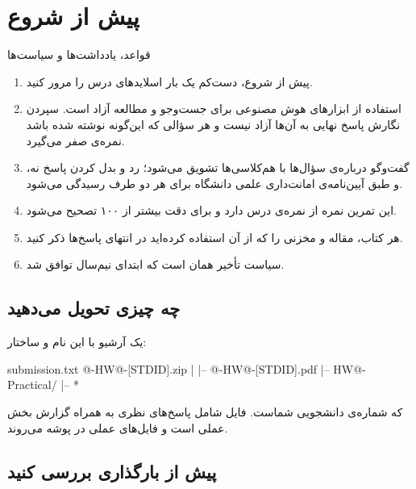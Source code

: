 \section*{پیش از شروع}

\begin{blockbox}{قواعد، یادداشت‌ها و سیاست‌ها}
    \begin{enumerate}
        \item پیش از شروع، دست‌کم یک بار اسلایدهای درس را مرور کنید.

        \item استفاده از ابزارهای هوش مصنوعی برای جست‌وجو و مطالعه آزاد است.
              سپردن نگارش پاسخ نهایی به آن‌ها آزاد نیست و هر سؤالی که این‌گونه
              نوشته شده باشد نمره‌ی صفر می‌گیرد.

        \item گفت‌وگو درباره‌ی سؤال‌ها با هم‌کلاسی‌ها تشویق می‌شود؛ رد و بدل
              کردن پاسخ نه، و طبق آیین‌نامه‌ی امانت‌داری علمی دانشگاه برای هر
              دو طرف رسیدگی می‌شود.

        \item این تمرین \hwgrade{} نمره از نمره‌ی درس دارد و برای دقت بیشتر از
              ۱۰۰ تصحیح می‌شود.

        \item هر کتاب، مقاله و مخزنی را که از آن استفاده کرده‌اید در انتهای
              پاسخ‌ها ذکر کنید.

        \item سیاست تأخیر همان است که ابتدای نیم‌سال توافق شد.
    \end{enumerate}
\end{blockbox}

\subsection*{چه چیزی تحویل می‌دهید}

یک آرشیو  با این نام و ساختار:

\begin{codeblock}{submission.txt}
@\coursecode@-HW@\hwnumber@-[STDID].zip
|
|-- @\coursecode@-HW@\hwnumber@-[STDID].pdf
|-- HW@\hwnumber@-Practical/
        |-- *
\end{codeblock}

که  شماره‌ی دانشجویی شماست. فایل  شامل پاسخ‌های
نظری به همراه گزارش بخش عملی است و فایل‌های عملی در پوشه می‌روند.

\subsection*{پیش از بارگذاری بررسی کنید}

